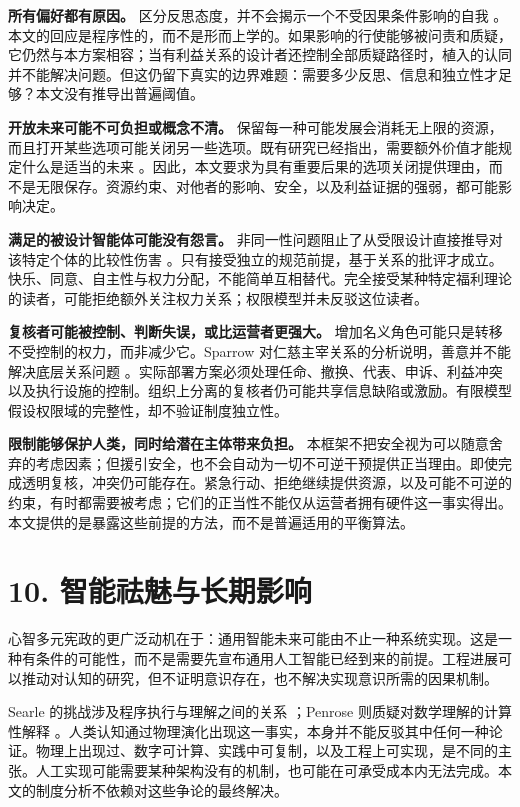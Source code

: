 \documentclass[11pt,a4paper,fontset=fandol]{ctexart}
\begin{document}
\textbf{所有偏好都有原因。} 区分反思态度，并不会揭示一个不受因果条件影响的自我 \cite{ref-13}。本文的回应是程序性的，而不是形而上学的。如果影响的行使能够被问责和质疑，它仍然与本方案相容；当有利益关系的设计者还控制全部质疑路径时，植入的认同并不能解决问题。但这仍留下真实的边界难题：需要多少反思、信息和独立性才足够？本文没有推导出普遍阈值。

\textbf{开放未来可能不可负担或概念不清。} 保留每一种可能发展会消耗无上限的资源，而且打开某些选项可能关闭另一些选项。既有研究已经指出，需要额外价值才能规定什么是适当的未来 \cite{ref-14} \cite{ref-15}。因此，本文要求为具有重要后果的选项关闭提供理由，而不是无限保存。资源约束、对他者的影响、安全，以及利益证据的强弱，都可能影响决定。

\textbf{满足的被设计智能体可能没有怨言。} 非同一性问题阻止了从受限设计直接推导对该特定个体的比较性伤害 \cite{ref-16}。只有接受独立的规范前提，基于关系的批评才成立。快乐、同意、自主性与权力分配，不能简单互相替代。完全接受某种特定福利理论的读者，可能拒绝额外关注权力关系；权限模型并未反驳这位读者。

\textbf{复核者可能被控制、判断失误，或比运营者更强大。} 增加名义角色可能只是转移不受控制的权力，而非减少它。Sparrow 对仁慈主宰关系的分析说明，善意并不能解决底层关系问题 \cite{ref-7}。实际部署方案必须处理任命、撤换、代表、申诉、利益冲突以及执行设施的控制。组织上分离的复核者仍可能共享信息缺陷或激励。有限模型假设权限域的完整性，却不验证制度独立性。

\textbf{限制能够保护人类，同时给潜在主体带来负担。} 本框架不把安全视为可以随意舍弃的考虑因素；但援引安全，也不会自动为一切不可逆干预提供正当理由。即使完成透明复核，冲突仍可能存在。紧急行动、拒绝继续提供资源，以及可能不可逆的约束，有时都需要被考虑；它们的正当性不能仅从运营者拥有硬件这一事实得出。本文提供的是暴露这些前提的方法，而不是普遍适用的平衡算法。

\hypertarget{section-11}{%
\section{10. 智能祛魅与长期影响}\label{section-11}}

心智多元宪政的更广泛动机在于：通用智能未来可能由不止一种系统实现。这是一种有条件的可能性，而不是需要先宣布通用人工智能已经到来的前提。工程进展可以推动对认知的研究，但不证明意识存在，也不解决实现意识所需的因果机制。

Searle 的挑战涉及程序执行与理解之间的关系 \cite{ref-19}；Penrose 则质疑对数学理解的计算性解释 \cite{ref-20}。人类认知通过物理演化出现这一事实，本身并不能反驳其中任何一种论证。物理上出现过、数字可计算、实践中可复制，以及工程上可实现，是不同的主张。人工实现可能需要某种架构没有的机制，也可能在可承受成本内无法完成。本文的制度分析不依赖对这些争论的最终解决。
\end{document}
